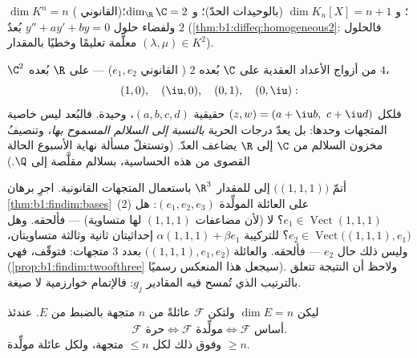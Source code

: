 \begin{example}\label{ex:b1:findim:dims}
$\dim K^n = n$ ( القانوني)؛ و $\dim K_n[X] = n + 1$ (بالوحيدات الحدّ)؛
و $\dim_\R \C = 2$؛ ولفضاء حلول $y'' + ay' + by = 0$
بُعدٌ $2$ (\cref{thm:b1:diffeq:homogeneous2}: فالحلول
معلَّمة تعليمًا  وخطيًا بالمقدار $(\lambda, \mu) \in K^2$).
\end{example}

\begin{example}
\label{ex:b1:findim:twodimensions}
 $\C^2$ من أزواج الأعداد العقدية  على $\C$
بُعده $2$ ( القانوني $e_1, e_2$) --- 
على $\R$ بُعده $4$، 
\[
(1, 0),\quad (\iu, 0),\quad (0, 1),\quad (0, \iu):
\]
فلكل $(z, w) = (a + \iu b,\ c + \iu d)$  حقيقية
$(a, b, c, d)$، وحيدة. فالبُعد ليس خاصية 
المتجهات وحدها: بل يعدّ درجات الحرية \emph{بالنسبة
إلى السلالم المسموح بها}، وتنصيفُ مخزون السلالم من $\C$
إلى $\R$ يضاعف العدّ. (وتستغلّ مسألة نهاية الأسبوع الحالة
القصوى من هذه الحساسية، بسلالم مقلَّصة إلى
$\Q$.)
\end{example}

\begin{example}
\label{ex:b1:findim:completion}
أتمّ  $\bigl((1,1,1)\bigr)$ إلى  للمقدار
$\R^3$ باستعمال المتجهات القانونية. اجرِ برهان
\cref{thm:b1:findim:bases}~(2) على العائلة المولِّدة $(e_1,
e_2, e_3)$: هل $e_1 \in \operatorname{Vect}(1,1,1)$؟ لا (لأن مضاعفات
$(1,1,1)$ لها  متساوية) --- فألحقه. وهل $e_2 \in
\operatorname{Vect}\bigl((1,1,1), e_1\bigr)$؟ للتركيبة
$\alpha(1,1,1) + \beta e_1$ إحداثيتان ثانية وثالثة متساويتان،
وليس ذلك حال $e_2$ --- فألحقه. والعائلة
$\bigl((1,1,1), e_1, e_2\bigr)$  بعدد $3$ متجهات: فتوقّف،
فهي  (\cref{prop:b1:findim:twoofthree} سيجعل هذا
المنعكس رسميًا). ولاحظ أن النتيجة تتعلق بالترتيب الذي تُمسح فيه
المقادير $g_j$: فالإتمام خوارزمية لا صيغة.
\end{example}

\begin{proposition}\label{prop:b1:findim:twoofthree}
ليكن $\dim E = n$ ولتكن $\mathcal{F}$ عائلةً من $n$ متجهة بالضبط
من $E$. عندئذ
\[
\mathcal{F} \text{ حرة} \iff \mathcal{F} \text{ مولِّدة} \iff
\mathcal{F} \text{ أساس}.
\]
وفوق ذلك لكل  $\leq n$ متجهة، ولكل عائلة مولِّدة
$\geq n$.
\end{proposition}

